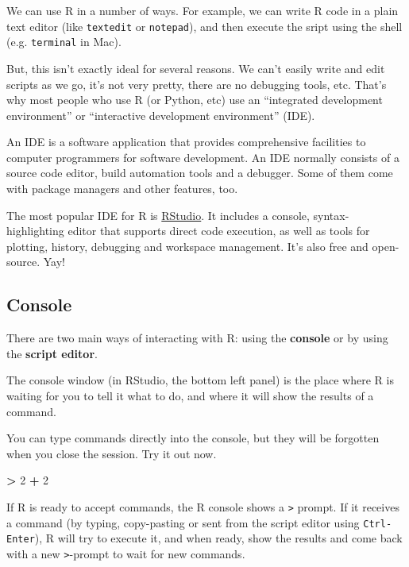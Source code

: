 \documentclass[]{book}
\newenvironment{Shaded}{\begin{snugshade}}{\end{snugshade}}
\newcommand{\DecValTok}[1]{\textcolor[rgb]{0.00,0.00,0.81}{#1}}
\newcommand{\StringTok}[1]{\textcolor[rgb]{0.31,0.60,0.02}{#1}}
\newcommand{\OperatorTok}[1]{\textcolor[rgb]{0.81,0.36,0.00}{\textbf{#1}}}
\begin{document}
We can use R in a number of ways. For example, we can write R code in a
plain text editor (like \texttt{textedit} or \texttt{notepad}), and then
execute the sript using the shell (e.g. \texttt{terminal} in Mac).

But, this isn't exactly ideal for several reasons. We can't easily write
and edit scripts as we go, it's not very pretty, there are no debugging
tools, etc. That's why most people who use R (or Python, etc) use an
``integrated development environment'' or ``interactive development
environment'' (IDE).

An IDE is a software application that provides comprehensive facilities
to computer programmers for software development. An IDE normally
consists of a source code editor, build automation tools and a debugger.
Some of them come with package managers and other features, too.

The most popular IDE for R is
\href{https://www.rstudio.com/products/rstudio/}{RStudio}. It includes a
console, syntax-highlighting editor that supports direct code execution,
as well as tools for plotting, history, debugging and workspace
management. It's also free and open-source. Yay!

\subsection{Console}\label{console}

There are two main ways of interacting with R: using the
\textbf{console} or by using the \textbf{script editor}.

The console window (in RStudio, the bottom left panel) is the place
where R is waiting for you to tell it what to do, and where it will show
the results of a command.

You can type commands directly into the console, but they will be
forgotten when you close the session. Try it out now.

\begin{Shaded}
\begin{Highlighting}[]
\OperatorTok{>}\StringTok{ }\DecValTok{2} \OperatorTok{+}\StringTok{ }\DecValTok{2}
\end{Highlighting}
\end{Shaded}

If R is ready to accept commands, the R console shows a
\texttt{\textgreater{}} prompt. If it receives a command (by typing,
copy-pasting or sent from the script editor using \texttt{Ctrl-Enter}),
R will try to execute it, and when ready, show the results and come back
with a new \texttt{\textgreater{}}-prompt to wait for new commands.
\end{document}
